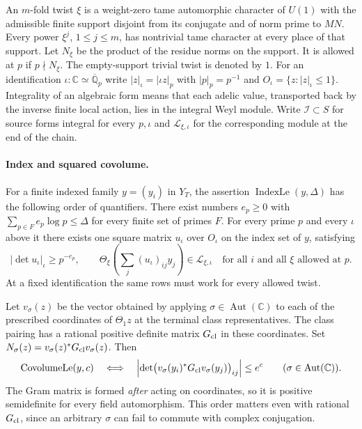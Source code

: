 An $m$-fold twist $\xi$ is a weight-zero tame automorphic character of
$U(1)$ with the admissible finite support disjoint from its conjugate
and of norm prime to $MN$. Every power $\xi^j$, $1\le j\le m$, has
nontrivial tame character at every place of that support. Let $N_\xi$ be
the product of the residue norms on the support. It is allowed at $p$ if
$p\nmid N_\xi$. The empty-support trivial twist is denoted by $1$.
For an identification $\iota:\mathbb C\simeq\overline{\mathbb Q}_p$ write
$|z|_\iota=|\iota z|_p$ with $|p|_p=p^{-1}$ and $O_\iota=\{z:|z|_\iota\le1\}$.
Integrality of an algebraic form means that each adelic value, transported
back by the inverse finite local action, lies in the integral Weyl module.
Write $\mathcal I\subset S$ for source forms integral for every $p,\iota$
and $\mathcal L_{\xi,\iota}$ for the corresponding module at the end of the chain.

\paragraph{Index and squared covolume.}
For a finite indexed family $y=(y_i)$ in $Y_T$, the assertion
$\operatorname{IndexLe}(y,\Delta)$ has the following order of quantifiers.
There exist numbers $e_p\ge0$ with $\sum_{p\in F}e_p\log p\le\Delta$ for
every finite set of primes $F$. For every prime $p$ and every $\iota$ above it
there exists one square matrix $u_\iota$ over $O_\iota$ on the index set of
$y$, satisfying
\begin{equation}\label{sz:index}
 |\det u_\iota|_\iota\ge p^{-e_p},\qquad
 \Theta_\xi\!\left(\sum_j (u_\iota)_{ij}y_j\right)\in\mathcal L_{\xi,\iota}
 \quad\text{for all }i\text{ and all }\xi\text{ allowed at }p.
\end{equation}
At a fixed identification the same rows must work for every allowed twist.

Let $v_\sigma(z)$ be the vector obtained by applying
$\sigma\in\operatorname{Aut}(\mathbb C)$ to each of the prescribed
coordinates of $\Theta_1z$ at the terminal class representatives.
The class pairing has a rational positive definite matrix $G_{\rm cl}$
in these coordinates. Set $N_\sigma(z)=v_\sigma(z)^*G_{\rm cl}v_\sigma(z)$.
Then
\begin{equation}\label{sz:covol}
 \operatorname{CovolumeLe}(y,c)\quad\Longleftrightarrow\quad
 \left|\det\bigl(v_\sigma(y_i)^*G_{\rm cl}v_\sigma(y_j)\bigr)_{ij}\right|
       \le e^c\qquad(\sigma\in\operatorname{Aut}(\mathbb C)).
\end{equation}
The Gram matrix is formed \emph{after} acting on coordinates, so it is positive
semidefinite for every field automorphism. This order matters even with rational
$G_{\rm cl}$, since an arbitrary $\sigma$ can fail to commute with complex conjugation.

